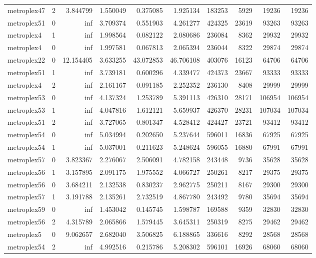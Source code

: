 \begin{longtable}{|l|r|r|r|r|r|r|r|r|r|}
metroplex47 & 2 & 3.844799 & 1.550049 & 0.375085 & 1.925134 & 183253 & 5929 & 19236 & 19236 \\
metroplex51 & 0 & inf & 3.709374 & 0.551903 & 4.261277 & 424325 & 23619 & 93263 & 93263 \\
metroplex4 & 1 & inf & 1.998564 & 0.082122 & 2.080686 & 236084 & 8362 & 29932 & 29932 \\
metroplex4 & 0 & inf & 1.997581 & 0.067813 & 2.065394 & 236044 & 8322 & 29874 & 29874 \\
metroplex22 & 0 & 12.154405 & 3.633255 & 43.072853 & 46.706108 & 403076 & 16123 & 64706 & 64706 \\
metroplex51 & 1 & inf & 3.739181 & 0.600296 & 4.339477 & 424373 & 23667 & 93333 & 93333 \\
metroplex4 & 2 & inf & 2.161167 & 0.091185 & 2.252352 & 236130 & 8408 & 29999 & 29999 \\
metroplex53 & 0 & inf & 4.137324 & 1.253789 & 5.391113 & 426310 & 28171 & 106954 & 106954 \\
metroplex53 & 1 & inf & 4.047816 & 1.612121 & 5.659937 & 426370 & 28231 & 107034 & 107034 \\
metroplex51 & 2 & inf & 3.727065 & 0.801347 & 4.528412 & 424427 & 23721 & 93412 & 93412 \\
metroplex54 & 0 & inf & 5.034994 & 0.202650 & 5.237644 & 596011 & 16836 & 67925 & 67925 \\
metroplex54 & 1 & inf & 5.037001 & 0.211623 & 5.248624 & 596055 & 16880 & 67991 & 67991 \\
metroplex57 & 0 & 3.823367 & 2.276067 & 2.506091 & 4.782158 & 243448 & 9736 & 35628 & 35628 \\
metroplex56 & 1 & 3.157895 & 2.091175 & 1.975552 & 4.066727 & 250261 & 8217 & 29375 & 29375 \\
metroplex56 & 0 & 3.684211 & 2.132538 & 0.830237 & 2.962775 & 250211 & 8167 & 29300 & 29300 \\
metroplex57 & 1 & 3.191788 & 2.135261 & 2.732519 & 4.867780 & 243492 & 9780 & 35694 & 35694 \\
metroplex59 & 0 & inf & 1.453042 & 0.145745 & 1.598787 & 169588 & 9359 & 32830 & 32830 \\
metroplex56 & 2 & 4.315789 & 2.065866 & 1.579445 & 3.645311 & 250319 & 8275 & 29462 & 29462 \\
metroplex5 & 0 & 9.062657 & 2.682040 & 3.506825 & 6.188865 & 336616 & 8292 & 28568 & 28568 \\
metroplex54 & 2 & inf & 4.992516 & 0.215786 & 5.208302 & 596101 & 16926 & 68060 & 68060 \\

\end{longtable}
